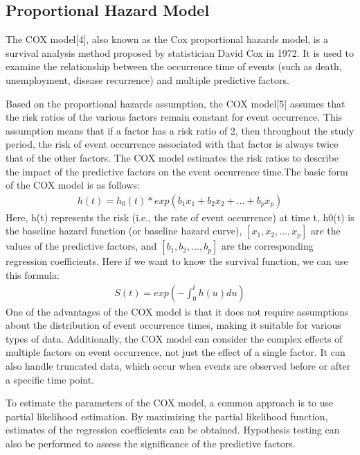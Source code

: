 \documentclass[conference]{IEEEconf}
\begin{document}
\subsection{Proportional Hazard Model}

The COX model[4], also known as the Cox proportional hazards model, is a survival analysis method proposed by statistician David Cox in 1972. It is used to examine the relationship between the occurrence time of events (such as death, unemployment, disease recurrence) and multiple predictive factors.

Based on the proportional hazards assumption, the COX model[5] assumes that the risk ratios of the various factors remain constant for event occurrence. This assumption means that if a factor has a risk ratio of 2, then throughout the study period, the risk of event occurrence associated with that factor is always twice that of the other factors. The COX model estimates the risk ratios to describe the impact of the predictive factors on the event occurrence time.The basic form of the COX model is as follows:
\begin{eqnarray}
	h(t) = h_{0}(t) * exp(b_{1}x_{1} + b_{2}x_{2} + ... + b_{p}x_{p})
\end{eqnarray}
Here, h(t) represents the risk (i.e., the rate of event occurrence) at time t, h0(t) is the baseline hazard function (or baseline hazard curve), $[x_{1}, x_{2}, ..., x_{p}]$ are the values of the predictive factors, and  $[b_{1}, b_{2}, ..., b_{p}]$  are the corresponding regression coefficients.
Here if we want to know the survival function, we can use this formula:
\begin{eqnarray}
	S(t)=exp(-\int_{0}^{t}h(u)du )
\end{eqnarray}
One of the advantages of the COX model is that it does not require assumptions about the distribution of event occurrence times, making it suitable for various types of data. Additionally, the COX model can consider the complex effects of multiple factors on event occurrence, not just the effect of a single factor. It can also handle truncated data, which occur when events are observed before or after a specific time point.

To estimate the parameters of the COX model, a common approach is to use partial likelihood estimation. By maximizing the partial likelihood function, estimates of the regression coefficients can be obtained. Hypothesis testing can also be performed to assess the significance of the predictive factors.
\end{document}
